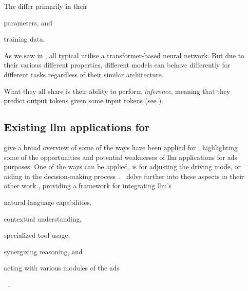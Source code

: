The  differ primarily in their \begin{inparaenum}
    \item parameters, and
    \item training data.
\end{inparaenum}
As we saw in , all typical  utilise a transformer-based neural
network. But due to their various different properties, different models can behave differently for
different tasks regardless of their similar architecture.

What they all share is their ability to perform \textit{inference}, meaning that they predict output
tokens given some input tokens (see ).

\subsection{Existing \acrshort{llm} applications for }\label{sec:llmsForAds}


\citeauthor{LLM4AD} give a broad overview of some of the ways  have been applied for
, highlighting some of the opportunities and potential weaknesses of \acrshort{llm}
applications for \acrshort{ads} purposes. One of the ways  can be applied, is for
adjusting the driving mode, or aiding in the decision-making
process~\cite[1]{LLM4AD}.~\citeauthor{driveAsYouSpeak} delve further into these aspects in their
other work , providing a framework for integrating \acrlong{llm}'s
\begin{inparaenum}
    \item natural language capabilities,
    \item contextual understanding,
    \item specialized tool usage,
    \item synergizing reasoning, and
    \item acting with various modules of the \acrshort{ads}
\end{inparaenum}~\cite[1]{driveAsYouSpeak}.